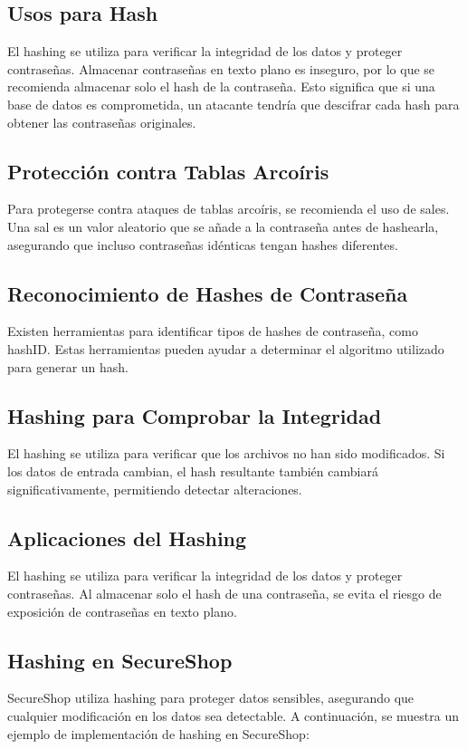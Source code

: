 \subsection{Usos para Hash}
El hashing se utiliza para verificar la integridad de los datos y proteger contraseñas. Almacenar contraseñas en texto plano es inseguro, por lo que se recomienda almacenar solo el hash de la contraseña. Esto significa que si una base de datos es comprometida, un atacante tendría que descifrar cada hash para obtener las contraseñas originales.

\subsection{Protección contra Tablas Arcoíris}
Para protegerse contra ataques de tablas arcoíris, se recomienda el uso de sales. Una sal es un valor aleatorio que se añade a la contraseña antes de hashearla, asegurando que incluso contraseñas idénticas tengan hashes diferentes.

\subsection{Reconocimiento de Hashes de Contraseña}
Existen herramientas para identificar tipos de hashes de contraseña, como hashID. Estas herramientas pueden ayudar a determinar el algoritmo utilizado para generar un hash.

\subsection{Hashing para Comprobar la Integridad}
El hashing se utiliza para verificar que los archivos no han sido modificados. Si los datos de entrada cambian, el hash resultante también cambiará significativamente, permitiendo detectar alteraciones.

\subsection{Aplicaciones del Hashing}
El hashing se utiliza para verificar la integridad de los datos y proteger contraseñas. Al almacenar solo el hash de una contraseña, se evita el riesgo de exposición de contraseñas en texto plano.

\subsection{Hashing en SecureShop}
SecureShop utiliza hashing para proteger datos sensibles, asegurando que cualquier modificación en los datos sea detectable. A continuación, se muestra un ejemplo de implementación de hashing en SecureShop:

